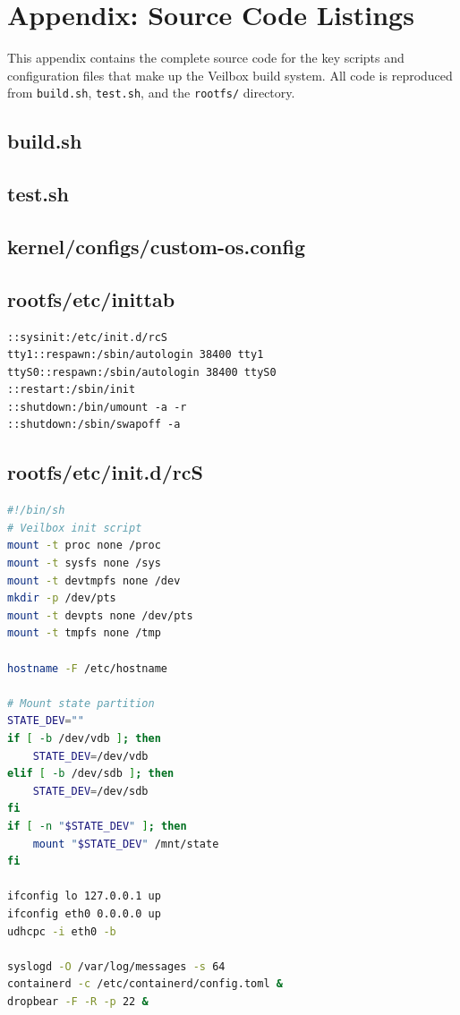 \chapter{Appendix: Source Code Listings}
\label{ch:appendix}

This appendix contains the complete source code for the key scripts
and configuration files that make up the Veilbox build system. All code
is reproduced from \texttt{build.sh}, \texttt{test.sh}, and the
\texttt{rootfs/} directory.

\section{build.sh}


\clearpage

\section{test.sh}


\clearpage

\section{kernel/configs/custom-os.config}


\clearpage

\section{rootfs/etc/inittab}

\begin{lstlisting}
::sysinit:/etc/init.d/rcS
tty1::respawn:/sbin/autologin 38400 tty1
ttyS0::respawn:/sbin/autologin 38400 ttyS0
::restart:/sbin/init
::shutdown:/bin/umount -a -r
::shutdown:/sbin/swapoff -a
\end{lstlisting}
\clearpage

\section{rootfs/etc/init.d/rcS}

\begin{lstlisting}[language=bash]
#!/bin/sh
# Veilbox init script
mount -t proc none /proc
mount -t sysfs none /sys
mount -t devtmpfs none /dev
mkdir -p /dev/pts
mount -t devpts none /dev/pts
mount -t tmpfs none /tmp

hostname -F /etc/hostname

# Mount state partition
STATE_DEV=""
if [ -b /dev/vdb ]; then
    STATE_DEV=/dev/vdb
elif [ -b /dev/sdb ]; then
    STATE_DEV=/dev/sdb
fi
if [ -n "$STATE_DEV" ]; then
    mount "$STATE_DEV" /mnt/state
fi

ifconfig lo 127.0.0.1 up
ifconfig eth0 0.0.0.0 up
udhcpc -i eth0 -b

syslogd -O /var/log/messages -s 64
containerd -c /etc/containerd/config.toml &
dropbear -F -R -p 22 &
\end{lstlisting}
\clearpage

